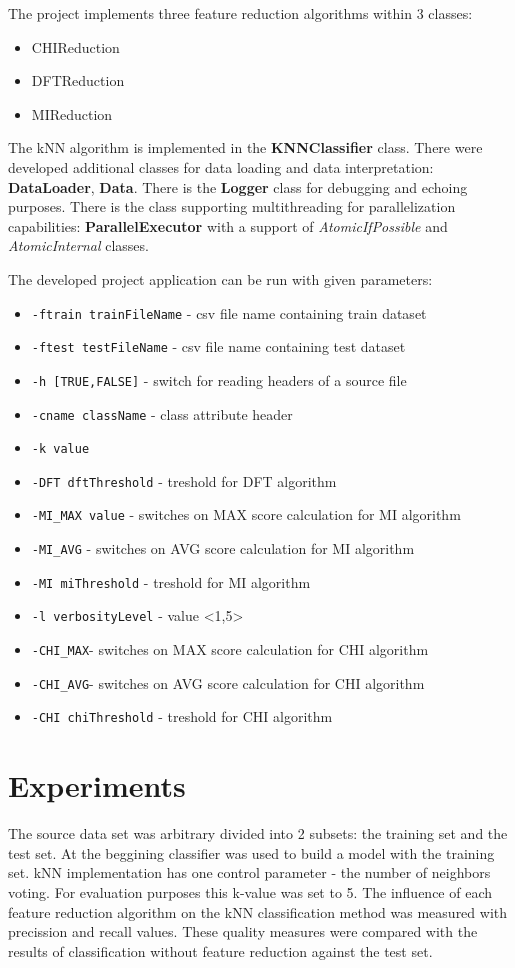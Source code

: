 \documentclass[12pt,a4paper]{report}
\begin{document}
The project implements three feature reduction algorithms within 3 classes:
\begin{itemize}
  \item CHIReduction
  \item DFTReduction
  \item MIReduction
\end{itemize}
The kNN algorithm is implemented in the \textbf{KNNClassifier} class. There were developed additional classes for data loading and data interpretation: \textbf{DataLoader}, \textbf{Data}. There is the \textbf{Logger} class for debugging and echoing purposes. There is the class supporting multithreading  for parallelization capabilities: \textbf{ParallelExecutor} with a support of \emph{AtomicIfPossible} and \emph{AtomicInternal} classes.

The developed project application can be run with given parameters:
\begin{itemize}
  \item \texttt{-ftrain trainFileName} - csv file name containing train dataset
  \item \texttt{-ftest testFileName} - csv file name containing test dataset
  \item \texttt{-h [TRUE,FALSE]} - switch for reading headers of a source file
  \item \texttt{-cname className} - class attribute header
  \item \texttt{-k value}
  \item \texttt{-DFT dftThreshold} - treshold for DFT algorithm
  \item \texttt{-MI\_MAX value} - switches on MAX score calculation for MI algorithm
  \item \texttt{-MI\_AVG} - switches on AVG score calculation for MI algorithm
  \item \texttt{-MI miThreshold} - treshold for MI algorithm
  \item \texttt{-l verbosityLevel} - value <1,5>
  \item \texttt{-CHI\_MAX}- switches on MAX score calculation for CHI algorithm
  \item \texttt{-CHI\_AVG}- switches on AVG score calculation for CHI algorithm
  \item \texttt{-CHI chiThreshold} - treshold for CHI algorithm
\end{itemize}

\chapter{Experiments}
The source data set was arbitrary divided into 2 subsets: the training set and the test set. At the beggining classifier was used to build a model with the training set. kNN implementation has one control parameter - the number of neighbors voting. For evaluation purposes this k-value was set to 5.
The influence of each feature reduction algorithm on the kNN classification method was measured with precission and recall values. These quality measures were compared with the results of classification without feature reduction against the test set.
\end{document}
